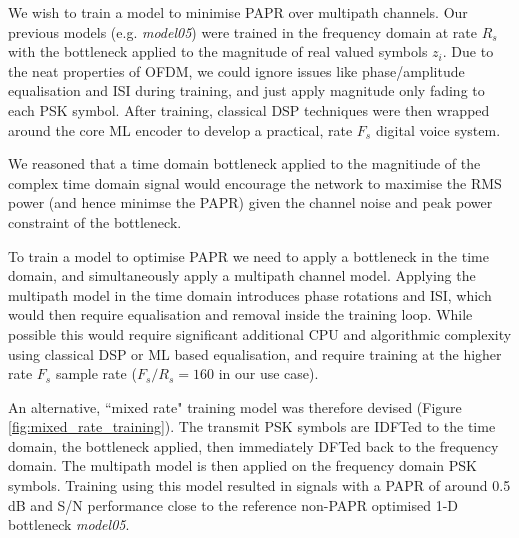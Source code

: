 \documentclass{article}
\begin{document}
We wish to train a model to minimise PAPR over multipath channels.  Our previous models (e.g. \emph{model05}) were trained in the frequency domain at rate $R_s$ with the bottleneck applied to the magnitude of real valued symbols $z_i$.  Due to the neat properties of OFDM, we could ignore issues like phase/amplitude equalisation and ISI during training, and just apply magnitude only fading to each PSK symbol.  After training, classical DSP techniques were then wrapped around the core ML encoder to develop a practical, rate $F_s$ digital voice system.

We reasoned that a time domain bottleneck applied to the magnitiude of the complex time domain signal would encourage the network to maximise the RMS power (and hence minimse the PAPR) given the channel noise and peak power constraint of the bottleneck.

To train a model to optimise PAPR we need to apply a bottleneck in the time domain, and simultaneously apply a multipath channel model.  Applying the multipath model in the time domain introduces phase rotations and ISI, which would then require equalisation and removal inside the training loop.  While possible this would require significant additional CPU and algorithmic complexity using classical DSP or ML based equalisation, and require training at the higher rate $F_s$ sample rate ($F_s/R_s=160$ in our use case).

An alternative, ``mixed rate" training model was therefore devised (Figure \ref{fig:mixed_rate_training}).  The transmit PSK symbols are IDFTed to the time domain, the bottleneck applied, then immediately DFTed back to the frequency domain.  The multipath model is then applied on the frequency domain PSK symbols.  Training using this model resulted in signals with a PAPR of around 0.5 dB and S/N performance close to the reference non-PAPR optimised 1-D bottleneck \emph{model05}.
\end{document}
